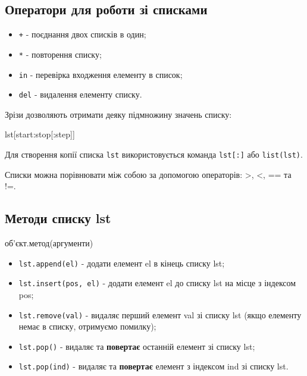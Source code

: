 \subsection{Оператори для роботи зі списками} 
\begin{frame}
    \begin{itemize}
        \item<1-> \texttt{+} - поєднання двох списків в один;
        \item<2-> \texttt{*} - повторення списку;
        \item<3-> \texttt{in} - перевірка входження елементу в список;
        \item<4-> \texttt{del} - видалення елементу списку.
    \end{itemize}
\end{frame}

\begin{frame}
Зрізи дозволяють отримати деяку підмножину значень списку:

\begin{center}
\huge{lst[start:stop[:step]]}
\end{center}
\normalsize

Для створення копії списка \texttt{lst} використовується команда \texttt{lst[:]} або \texttt{list(lst)}.

Списки можна порівнювати між собою за допомогою операторів: >, <, == та !=.
\end{frame}

\subsection{Методи списку lst} 
\begin{frame}
\begin{center}
об'єкт.метод(аргументи)
\end{center}
\begin{itemize}
        \item<1-> \texttt{lst.append(el)} - додати елемент el в кінець списку lst;
        \item<2-> \texttt{lst.insert(pos, el)} - додати елемент el до списку lst на місце з індексом pos;
        \item<3-> \texttt{lst.remove(val)} - видаляє перший елемент val зі списку lst (якщо елементу немає в списку, отримуємо помилку);
        \item<4-> \texttt{lst.pop()} - видаляє та \textbf{повертає} останній елемент зі списку lst;
        \item<4-> \texttt{lst.pop(ind)} - видаляє та \textbf{повертає} елемент з індексом ind зі списку lst.
    \end{itemize}
\end{frame}

